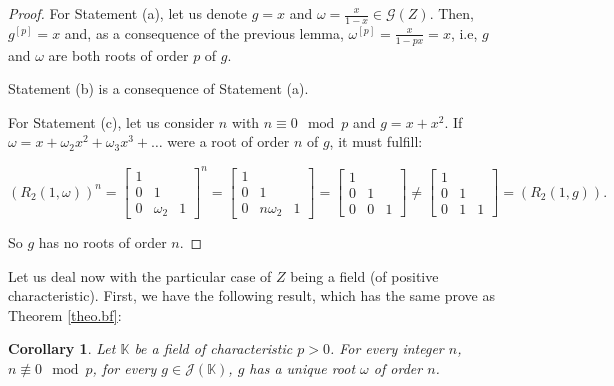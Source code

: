 \documentclass[preprint,12pt]{elsarticle}
\newtheorem{coro}[thm]{Corollary}
\begin{document}
\begin{proof}  For Statement (a), let us denote $g=x$ and $\omega=\frac{x}{1-x}\in\mathcal G(Z)$. Then, $g^{[p]} = x$  and, as a consequence of the previous lemma, $\omega^{[p]} = \frac{x}{1 - px} = x$, i.e, $g$ and $\omega$ are both roots of order $p$ of $g$.


\medskip

Statement (b) is a consequence of Statement (a).


\medskip 

For Statement (c), let us consider $n$ with $n\equiv 0\mod p$ and $g=x+x^2$. If $\omega=x+\omega_2x^2+\omega_3x^3+\ldots$ were a root of order $n$ of $g$, it must fulfill:

$$(R_2(1,\omega))^n=
\begin{bmatrix}1\\ 0 & 1 \\ 0 & \omega_2 & 1 \end{bmatrix}^n
=\begin{bmatrix}1\\ 0 & 1 \\ 0 & n \omega_2 & 1 \end{bmatrix}
=\begin{bmatrix}1\\ 0 & 1 \\ 0 & 0 & 1 \end{bmatrix} \neq \begin{bmatrix}1\\ 0 & 1 \\ 0 & 1 & 1 \end{bmatrix} = (R_2(1,g)).$$


\noindent  So $g$  has no roots of order $n$.
\end{proof}




Let us deal now with the particular case of $Z$ being a field (of positive characteristic). First, we have the following result,  which has the same prove as Theorem \ref{theo.bf}: 




\begin{coro} Let $\mathbb K$ be a field of characteristic $p>0$. For every integer $n$, $n\not\equiv 0\mod p$, for every $g\in\mathcal J(\mathbb K)$, $g$ has a unique root $\omega$ of order $n$.




\end{coro}
\end{document}

